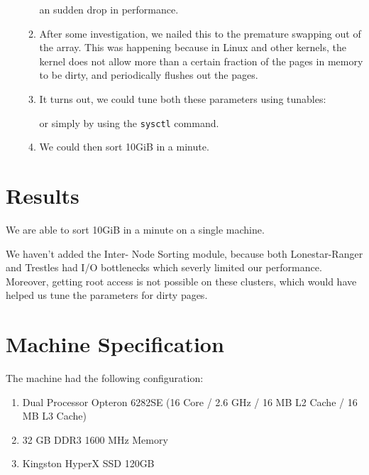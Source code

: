 \documentclass{article}
\begin{document}
\begin{enumerate}
\begin{enumerate}
	an sudden drop in performance.
	\item After some investigation, we nailed this to the premature swapping out of the array.
	This was happening because in Linux and other kernels, the kernel does not allow more than
	a certain fraction of the pages in memory to be dirty, and periodically flushes out the
	pages.
	\item It turns out, we could tune both these parameters using tunables:
          or simply by using the \verb#sysctl# command.
	\item We could then sort 10GiB in a minute.
	\end{enumerate}
\end{enumerate}

\section{Results}
We are able to sort 10GiB in a minute on a single machine.

We haven't added the Inter-
Node Sorting module, because both Lonestar-Ranger and Trestles 
had I/O bottlenecks which severly limited our performance. 
Moreover, getting root access is not possible on these clusters,
which would have helped us tune the parameters for dirty pages.


\section{Machine Specification}
The machine had the following configuration:
\begin{enumerate}
\item Dual Processor Opteron 6282SE (16 Core / 2.6 GHz / 16 MB L2 Cache / 16 MB L3 Cache)
\item 32 GB DDR3 1600 MHz Memory
\item Kingston HyperX SSD 120GB
\end{enumerate}
\end{document}
